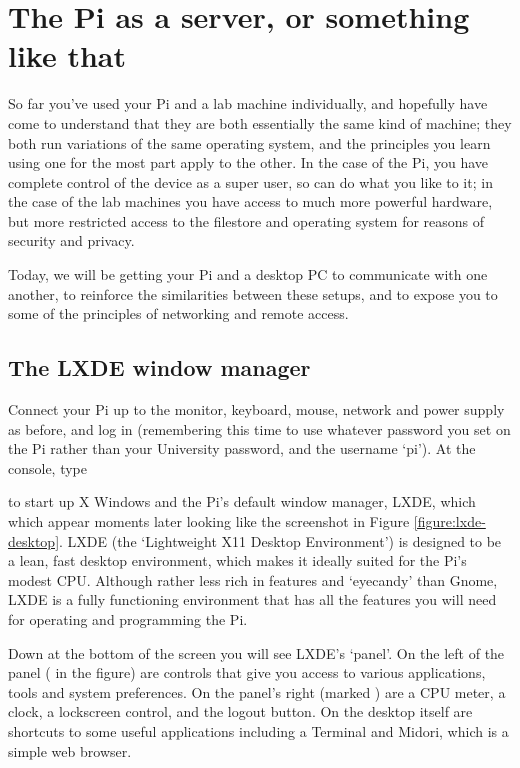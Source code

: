 \chapter{The Pi as a server, or something like that}


So far you've used your Pi and a lab machine individually, and hopefully have come to understand that they are both essentially the same kind of machine; they both run variations of the same operating system, and the principles you learn using one for the most part apply to the other. In the case of the Pi, you have complete control of the device as a super user, so can do what you like to it; in the case of the lab machines you have access to much more powerful hardware, but more restricted access to the filestore and operating system for reasons of security and privacy. 

Today, we will be getting your Pi and a desktop PC to communicate with one another, to reinforce the similarities between these setups, and to expose you to some of the principles of networking and remote access. 

\section{The LXDE window manager}

Connect your Pi up to the monitor, keyboard, mouse, network and power supply as before, and log in (remembering this time to use whatever password you set on the Pi rather than your University password, and the username `pi'). At the console, type


to start up X Windows and the Pi's default window manager, LXDE, which which appear moments later looking like the screenshot in Figure \ref{figure:lxde-desktop}. LXDE (the `Lightweight X11 Desktop Environment') is designed to be a lean, fast desktop environment, which makes it ideally suited for the Pi's modest CPU. Although rather less rich in features and `eyecandy' than Gnome, LXDE is a fully functioning environment that has all the features you will need for operating and programming the Pi. 

Down at the bottom of the screen you will see LXDE's `panel'. On the left of the panel (\protect{} in the figure) are controls that give you access to various applications, tools and system preferences. On the panel's right (marked \protect{}) are a CPU meter, a clock, a lockscreen control, and the logout button. On the desktop itself are shortcuts to some useful applications including a Terminal and Midori, which is a simple web browser. 

